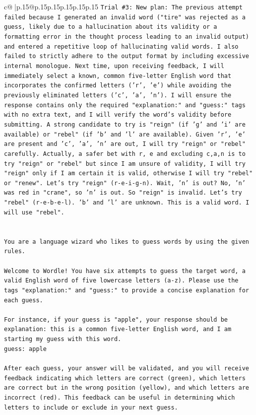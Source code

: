 \documentclass{article}
\begin{document}
{\begin{supertabular}{c@{$\;$}|p{.15\linewidth}@{}p{.15\linewidth}p{.15\linewidth}p{.15\linewidth}p{.15\linewidth}p{.15\linewidth}}
{{{\texttt{Trial \#3: New plan: The previous attempt failed because I generated an invalid word ("tire" was rejected as a guess, likely due to a hallucination about its validity or a formatting error in the thought process leading to an invalid output) and entered a repetitive loop of hallucinating valid words. I also failed to strictly adhere to the output format by including excessive internal monologue. Next time, upon receiving feedback, I will immediately select a known, common five{-}letter English word that incorporates the confirmed letters ('r', 'e') while avoiding the previously eliminated letters ('c', 'a', 'n'). I will ensure the response contains only the required "explanation:" and "guess:" tags with no extra text, and I will verify the word's validity before submitting. A strong candidate to try is "reign" (if 'g' and 'i' are available) or "rebel" (if 'b' and 'l' are available). Given 'r', 'e' are present and 'c', 'a', 'n' are out, I will try "reign" or "rebel" carefully. Actually, a safer bet with r, e and excluding c,a,n is to try "reign" or "rebel" but since I am unsure of validity, I will try "reign" only if I am certain it is valid, otherwise I will try "rebel" or "renew". Let's try "reign" (r{-}e{-}i{-}g{-}n). Wait, 'n' is out? No, 'n' was red in "crane", so 'n' is out. So "reign" is invalid. Let's try "rebel" (r{-}e{-}b{-}e{-}l). 'b' and 'l' are unknown. This is a valid word. I will use "rebel".} \\
\\ 
\\ 
\texttt{You are a language wizard who likes to guess words by using the given rules.} \\
\\ 
\texttt{Welcome to Wordle! You have six attempts to guess the target word, a valid English word of five lowercase letters (a{-}z). Please use the tags "explanation:" and "guess:" to provide a concise explanation for each guess.} \\
\\ 
\texttt{For instance, if your guess is "apple", your response should be} \\
\texttt{explanation: this is a common five{-}letter English word, and I am starting my guess with this word.} \\
\texttt{guess: apple} \\
\\ 
\texttt{After each guess, your answer will be validated, and you will receive feedback indicating which letters are correct (green), which letters are correct but in the wrong position (yellow), and which letters are incorrect (red). This feedback can be useful in determining which letters to include or exclude in your next guess.} \\
}}}
\end{supertabular}}
\end{document}

